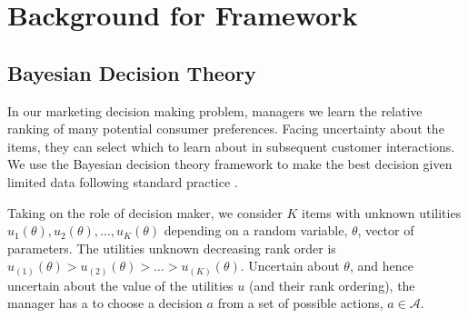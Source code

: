 \documentclass[blindrev]{informs3} %
\newcommand{\numitems}{K}
\begin{document}










\section{Background for Framework}

\subsection{Bayesian Decision Theory}

In our marketing decision making problem, managers we learn the relative ranking of many potential consumer preferences. Facing uncertainty about the items, they can select which to learn about in subsequent customer interactions. We use the Bayesian decision theory framework to make the best decision given limited data following standard practice \citep{GelmanEtAl2004}. 

Taking on the role of decision maker, we consider $\numitems$ items with unknown utilities $u_1(\theta),u_2(\theta), \ldots, u_\numitems(\theta)$ depending on a random variable, $\theta$,  vector of parameters. The utilities unknown decreasing rank order is $u_{(1)}(\theta) > u_{(2)}(\theta) > \ldots > u_{(\numitems)}(\theta)$. Uncertain about $\theta$, and hence uncertain about the value of the utilities $u$ (and their rank ordering), the manager has a to choose a decision $a$ from a set of possible actions, $a \in \mathcal{A}$. 
\end{document}
